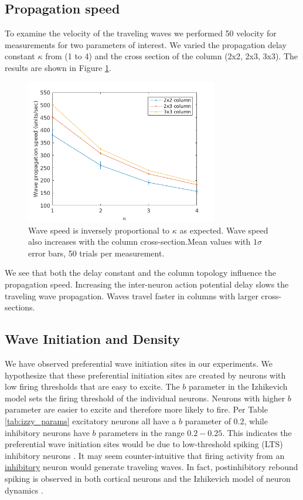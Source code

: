 \documentclass[a4paper,11pt]{article}
\begin{document}
\subsection{Propagation speed} \label{sub:propagation_speed}
To examine the velocity of the traveling waves we performed 50 velocity for measurements for two parameters of interest.
We varied the propagation delay constant $\kappa$ from (1 to 4) and the cross section of the column (2x2, 2x3, 3x3).
The results are shown in Figure \ref{fig:delay_topology}.
\begin{figure}[!htb]
 \caption{Wave speed is inversely proportional to $\kappa$ as expected. Wave speed also increases with the column cross-section.Mean values with $1\sigma$ error bars, 50 trials per measurement.}
 \label{fig:delay_topology}
 \centering
   \includegraphics[width=0.75\textwidth]{fig/WaveSpeed_DelayTopology}
\end{figure}

We see that both the delay constant and the column topology influence the propagation speed.
Increasing the inter-neuron action potential delay slows the traveling wave propagation.
Waves travel faster in columns with larger cross-sections. 

\subsection{Wave Initiation and Density} \label{sub:wave_initiation}
We have observed preferential wave initiation sites in our experiments.
We hypothesize that these preferential initiation sites are created by neurons with low firing thresholds that are easy to excite.
The $b$ parameter in the Izhikevich model sets the firing threshold of the individual neurons.
Neurons with higher $b$ parameter are easier to excite and therefore more likely to fire.
Per Table \ref{tab:izzy_params} excitatory neurons all have a $b$ parameter of $0.2$, while inhibitory neurons have $b$ parameters in the range $0.2-0.25$.
This indicates the preferential wave initiation sites would be due to low-threshold spiking (LTS) inhibitory neurons \cite{izhikevich2003}.
It may seem counter-intuitive that firing activity from an \underline{inhibitory} neuron would generate traveling waves.
In fact, postinhibitory rebound spiking is observed in both cortical neurons \cite{ascoli2010} and the Izhikevich model of neuron dynamics \cite{izhikevich}.
\end{document}
